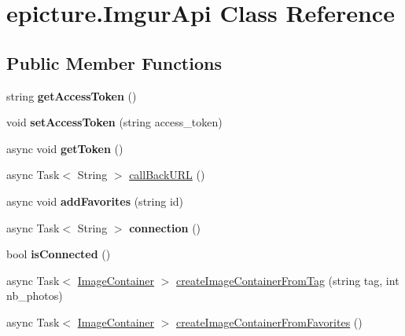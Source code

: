 \hypertarget{classepicture_1_1_imgur_api}{}\section{epicture.\+Imgur\+Api Class Reference}
\label{classepicture_1_1_imgur_api}
\subsection*{Public Member Functions}
\begin{DoxyCompactItemize}
\item 
\mbox{\label{classepicture_1_1_imgur_api_a7d14cc12e95904ccb278443ce30d70b9}} 
string {\bfseries get\+Access\+Token} ()
\item 
\mbox{\label{classepicture_1_1_imgur_api_a4e6484b3040b1519dc6bbc721e2e074f}} 
void {\bfseries set\+Access\+Token} (string access\+\_\+token)
\item 
\mbox{\label{classepicture_1_1_imgur_api_ad8ebbd689e638e24f11cd763658640fe}} 
async void {\bfseries get\+Token} ()
\item 
async Task$<$ String $>$ \mbox{\hyperlink{classepicture_1_1_imgur_api_a3ddaf3c09b2d5edf39ace0f2390f78a9}{call\+Back\+U\+RL}} ()
\item 
\mbox{\label{classepicture_1_1_imgur_api_aebdd7484625ef704946e3966933db563}} 
async void {\bfseries add\+Favorites} (string id)
\item 
\mbox{\label{classepicture_1_1_imgur_api_af0cb0b13ba443097dbde0980267b9b20}} 
async Task$<$ String $>$ {\bfseries connection} ()
\item 
\mbox{\label{classepicture_1_1_imgur_api_affe36b9f3403dfbfdfbdea7811c54453}} 
bool {\bfseries is\+Connected} ()
\item 
async Task$<$ \mbox{\hyperlink{classepicture_1_1_image_container}{Image\+Container}} $>$ \mbox{\hyperlink{classepicture_1_1_imgur_api_ac4db02936c30dfc87f1b5557f7a7af75}{create\+Image\+Container\+From\+Tag}} (string tag, int nb\+\_\+photos)
\item 
async Task$<$ \mbox{\hyperlink{classepicture_1_1_image_container}{Image\+Container}} $>$ \mbox{\hyperlink{classepicture_1_1_imgur_api_a105393adc1ac69c9be3fbd9c020c1b57}{create\+Image\+Container\+From\+Favorites}} ()

\end{DoxyCompactItemize}
